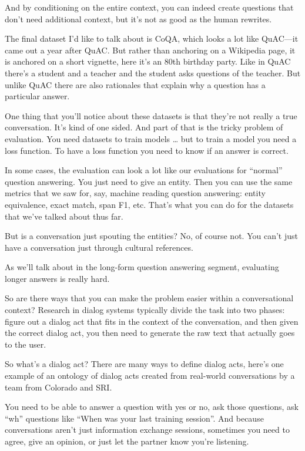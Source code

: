 And by conditioning on the entire context, you can indeed create questions that don’t need additional context, but it’s not as good as the human rewrites.

The final dataset I’d like to talk about is CoQA, which looks a lot like QuAC—it came out a year after QuAC.  But rather than anchoring on a Wikipedia page, it is anchored on a short vignette, here it’s an 80th birthday party.  Like in QuAC there’s a student and a teacher and the student asks questions of the teacher.  But unlike QuAC there are also rationales that explain why a question has a particular answer.

One thing that you’ll notice about these datasets is that they’re not really a true conversation.  It’s kind of one sided.  And part of that is the tricky problem of evaluation.  You need datasets to train models … but to train a model you need a loss function.  To have a loss function you need to know if an answer is correct.  

In some cases, the evaluation can look a lot like our evaluations for “normal” question answering.  You just need to give an entity.  Then you can use the same metrics that we saw for, say, machine reading question answering: entity equivalence, exact match, span F1, etc.  That’s what you can do for the datasets that we’ve talked about thus far.

But is a conversation just spouting the entities?  No, of course not.  You can’t just have a conversation just through cultural references.  

As we’ll talk about in the long-form question answering segment, evaluating longer answers is really hard.  

So are there ways that you can make the problem easier within a conversational context?  Research in dialog systems typically divide the task into two phases: figure out a dialog act that fits in the context of the conversation, and then given the correct dialog act, you then need to generate the raw text that actually goes to the user. 

So what’s a dialog act?  There are many ways to define dialog acts, here’s one example of an ontology of dialog acts created from real-world conversations by a team from Colorado and SRI.  

You need to be able to answer a question with yes or no, ask those questions, ask “wh” questions like “When was your last training session”.  And because conversations aren’t just information exchange sessions, sometimes you need to agree, give an opinion, or just let the partner know you’re listening.  

